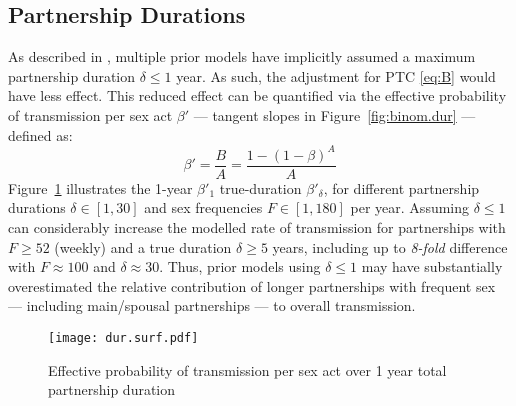 \subsection{Partnership Durations}\label{foi.exp.dur}
As described in , multiple prior models have
implicitly assumed a maximum partnership duration $\delta \le 1$ year.
As such, the adjustment for PTC \eqref{eq:B} would have less effect.
This reduced effect can be quantified via
the effective probability of transmission per sex act $\beta'$
--- \ie tangent slopes in Figure~\ref{fig:binom.dur} --- defined as:
\begin{equation}\label{eq:beta.eff}
  \beta' = \frac{B}{A} = \frac{1 - {(1 - \beta)}^{A}}{A}
\end{equation}
Figure~\ref{fig:dur.surf} illustrates the 1-year $\beta'_1$ \vs true-duration $\beta'_\delta$, for
different partnership durations $\delta \in [1, 30]$ and sex frequencies $F \in [1,180]$ per year.
Assuming $\delta \le 1$ can considerably increase the modelled rate of transmission
for partnerships with $F \ge 52$ (\ie weekly) and a true duration $\delta \ge 5$ years,
including up to \emph{8-fold} difference with $F \approx 100$ and $\delta \approx 30$.
Thus, prior models using $\delta \le 1$ may have
substantially overestimated the relative contribution of
longer partnerships with frequent sex --- including main/spousal partnerships ---
to overall transmission.
\begin{figure}
  \centering\texttt{[image: dur.surf.pdf]}
  \caption{Effective probability of transmission per sex act
    over 1 year \vs total partnership duration}
  \label{fig:dur.surf}
\end{figure}
\clearpage %
